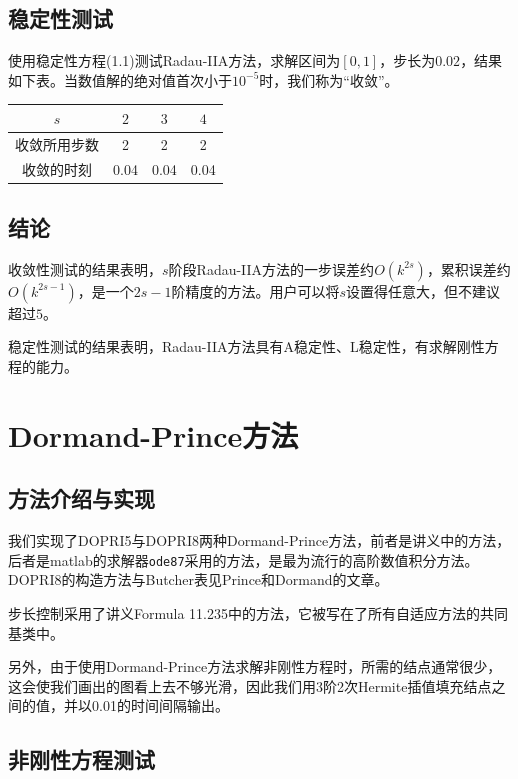 \documentclass[lang=cn,10pt,bibend=bibtex]{elegantbook}
\begin{document}
\subsection{稳定性测试}

使用稳定性方程(1.1)测试Radau-IIA方法，求解区间为$[0,1]$，步长为$0.02$，结果如下表。当数值解的绝对值首次小于$10^{-5}$时，我们称为“收敛”。

\begin{table}[htbp]
  \centering
  \renewcommand\arraystretch{1.1}
  \begin{tabular}{c|ccc}
    $s$ & $2$ & $3$ & $4$\\ \hline
    收敛所用步数 & 2 & 2 & 2\\
    收敛的时刻 & 0.04 & 0.04 & 0.04
  \end{tabular}
\end{table}
\vspace{-2em}

\subsection{结论}

收敛性测试的结果表明，$s$阶段Radau-IIA方法的一步误差约$O(k^{2s})$，累积误差约$O(k^{2s-1})$，是一个$2s-1$阶精度的方法。用户可以将$s$设置得任意大，但不建议超过$5$。

稳定性测试的结果表明，Radau-IIA方法具有A稳定性、L稳定性，有求解刚性方程的能力。

\section{Dormand-Prince方法}

\subsection{方法介绍与实现}

我们实现了DOPRI5与DOPRI8两种Dormand-Prince方法，前者是讲义中的方法，后者是matlab的求解器\verb|ode87|采用的方法，是最为流行的高阶数值积分方法。DOPRI8的构造方法与Butcher表见Prince和Dormand的文章\cite{PRINCE198167}。

步长控制采用了讲义Formula 11.235中的方法，它被写在了所有自适应方法的共同基类中。

另外，由于使用Dormand-Prince方法求解非刚性方程时，所需的结点通常很少，这会使我们画出的图看上去不够光滑，因此我们用3阶2次Hermite插值填充结点之间的值，并以0.01的时间间隔输出。

\subsection{非刚性方程测试}
\end{document}
